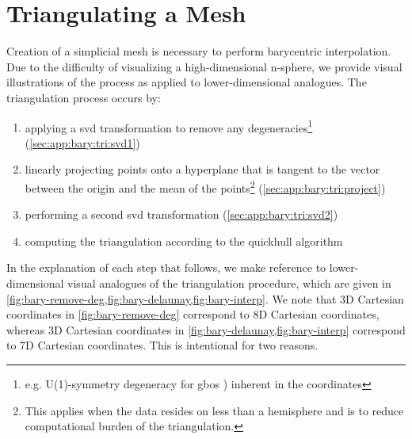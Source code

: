 \documentclass[final,12pt]{elsarticle}
\begin{document}
%
%
\section{Triangulating a Mesh}
\label{sec:app:bary:tri}

Creation of a simplicial mesh is necessary to perform barycentric interpolation. Due to the difficulty of visualizing a high-dimensional n-sphere, we provide visual illustrations of the process as applied to lower-dimensional analogues. The triangulation process occurs by:
\begin{enumerate}%
	\item[1.1] applying a \gls{svd} transformation to remove any degeneracies\footnote{e.g. U(1)-symmetry degeneracy for \glspl{gbo} \cite{francisGeodesicOctonionMetric2019}) inherent in the coordinates} (\cref{sec:app:bary:tri:svd1})
	\item[1.2] linearly projecting points onto a hyperplane that is tangent to the vector between the origin and the mean of the \inpt{} points\footnote{This applies when the data resides on less than a hemisphere and is to reduce computational burden of the triangulation. } (\cref{sec:app:bary:tri:project})
	\item[1.3] performing a second \gls{svd} transformation (\cref{sec:app:bary:tri:svd2})
	\item[1.4] computing the triangulation according to the quickhull algorithm \cite{barberQuickhullAlgorithmConvex1996}
\end{enumerate}

In the explanation of each step that follows, we make reference to lower-dimensional visual analogues of the triangulation procedure, which are given in \cref{fig:bary-remove-deg,fig:bary-delaunay,fig:bary-interp}. We note that 3D Cartesian coordinates in \cref{fig:bary-remove-deg} correspond to 8D Cartesian coordinates, whereas 3D Cartesian coordinates in \cref{fig:bary-delaunay,fig:bary-interp} correspond to 7D Cartesian coordinates. This is intentional for two reasons.
\end{document}
